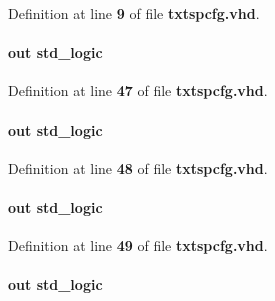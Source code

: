 Definition at line {\bf 9} of file {\bf txtspcfg.\+vhd}.

\paragraph[{lms\+\_\+gpio0}]{ {\bfseries \textcolor{keywordflow}{out}\textcolor{vhdlchar}{ }} {\bfseries \textcolor{comment}{std\+\_\+logic}\textcolor{vhdlchar}{ }} \hspace{0.3cm}{\ttfamily [Port]}}\label{classtxtspcfg_abc0d50997341a87cd10f835515bf0084}


Definition at line {\bf 47} of file {\bf txtspcfg.\+vhd}.

\paragraph[{lms\+\_\+gpio1}]{ {\bfseries \textcolor{keywordflow}{out}\textcolor{vhdlchar}{ }} {\bfseries \textcolor{comment}{std\+\_\+logic}\textcolor{vhdlchar}{ }} \hspace{0.3cm}{\ttfamily [Port]}}\label{classtxtspcfg_a9c9674ef5d59c9034e48aa1e8eeca546}


Definition at line {\bf 48} of file {\bf txtspcfg.\+vhd}.

\paragraph[{lms\+\_\+gpio2}]{ {\bfseries \textcolor{keywordflow}{out}\textcolor{vhdlchar}{ }} {\bfseries \textcolor{comment}{std\+\_\+logic}\textcolor{vhdlchar}{ }} \hspace{0.3cm}{\ttfamily [Port]}}\label{classtxtspcfg_a54db39d5af84df83357221529143d485}


Definition at line {\bf 49} of file {\bf txtspcfg.\+vhd}.

\paragraph[{lms\+\_\+rst}]{ {\bfseries \textcolor{keywordflow}{out}\textcolor{vhdlchar}{ }} {\bfseries \textcolor{comment}{std\+\_\+logic}\textcolor{vhdlchar}{ }} \hspace{0.3cm}{\ttfamily [Port]}}\label{classtxtspcfg_adfb72924f6685d773893065a330948a6}


